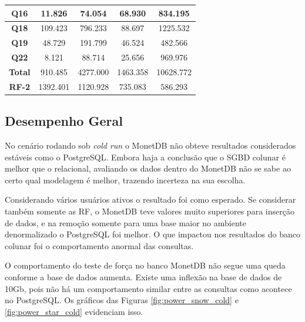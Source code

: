 \begin{table}[t]
\begin{tabular}{|c|c|c|c|c|}
        \textbf{Q16}   & 11.826                & 74.054                   & 68.930              & 834.195               \\ \hline
        \textbf{Q18}   & 109.423               & 796.233                  & 88.697              & 1225.532              \\ \hline
        \textbf{Q19}   & 48.729                & 191.799                  & 46.524              & 482.566               \\ \hline
        \textbf{Q22}   & 8.121                 & 88.714                   & 25.656              & 969.976               \\ \hline
        \textbf{Total} & 910.485               & 4277.000                 & 1463.358            & 10628.772             \\ \hline
        \textbf{RF-2}  & 1392.401              & 1120.928                 & 735.083             & 586.293               \\ \hline

\end{tabular}
\end{table}


\subsection{Desempenho Geral}

No cenário rodando sob \textit{cold run} o MonetDB não obteve resultados considerados estáveis como o PostgreSQL. Embora haja a conclusão que o SGBD colunar é melhor que o relacional, avaliando os dados dentro do MonetDB não se sabe ao certo qual modelagem é melhor, trazendo incerteza na sua escolha. 

Considerando vários usuários ativos o resultado foi como esperado. Se considerar também somente as RF, o MonetDB teve valores muito superiores para inserção de dados, e na remoção somente para uma base maior no ambiente denormalizado o PostgreSQL foi melhor. O que impactou nos resultados do banco colunar foi o comportamento anormal das consultas.

O comportamento do teste de força no banco MonetDB não segue uma queda conforme a base de dados aumenta. Existe uma inflexão na base de dados de 10Gb, pois não há um comportamento similar entre as consultas como acontece no PostgreSQL. Os gráficos das Figuras \ref{fig:power_snow_cold} e \ref{fig:power_star_cold} evidenciam isso. 

